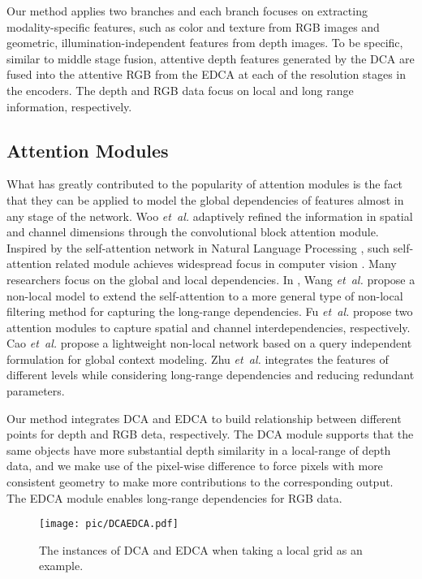 \documentclass[10pt,twocolumn,letterpaper]{article}
\begin{document}
Our method applies two branches and each branch focuses on extracting modality-specific features, such as color and texture from RGB
images and geometric, illumination-independent features from depth images. To be specific, similar to middle stage fusion, attentive
depth features generated by the DCA are fused into the attentive RGB from the EDCA at each of the resolution stages in the
encoders. The depth and RGB data focus on local and long range information, respectively.

\subsection{Attention Modules} What has greatly contributed to the popularity of attention modules is the fact that they can be
applied to model the global dependencies of features almost in any stage of the network. Woo \textit{et~al.}
\cite{woo2018cbam} adaptively refined the information in spatial and channel dimensions through the convolutional block attention module.
Inspired by the self-attention network in Natural Language Processing \cite{vaswani2017attention}, such self-attention related module
achieves widespread focus in computer vision \cite{zhao2020exploring,vaswani2021scaling,ramachandran2019stand}. Many researchers focus
on the global and local dependencies.  In \cite{wang2018non}, Wang \textit{et~al.} propose a non-local model to extend the self-attention
to a more general type of non-local filtering method for capturing the long-range dependencies. Fu \textit{et~al.} \cite{fu2019dual}
propose two attention modules to capture spatial and channel interdependencies, respectively. Cao \textit{et~al.} \cite{cao2019gcnet}
propose a lightweight non-local network based on a query independent formulation for global context modeling.
Zhu \textit{et~al.} \cite{zhu2019asymmetric} integrates the features of different levels while considering long-range dependencies and
reducing redundant parameters.

Our method integrates DCA and EDCA to build relationship between different points for depth and RGB deta, respectively.
The DCA module supports that the same objects have more substantial depth similarity in a local-range of depth data, and we make use of the
pixel-wise difference to force pixels with more consistent geometry to make more contributions to the corresponding output.
The EDCA module enables long-range dependencies for RGB data.

\begin{figure}[t]
   \centering
   \texttt{[image: pic/DCAEDCA.pdf]}
   \caption{The instances of DCA and EDCA when taking a  local grid as an example.}
   \label{piexl_diff}
\end{figure}
\end{document}
